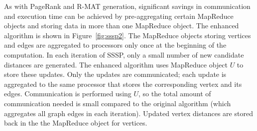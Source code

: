 As with PageRank and R-MAT generation, 
significant savings in communication and execution time
can be achieved by pre-aggregating certain MapReduce objects and 
storing data in more than one MapReduce object.  The enhanced algorithm
is shown in Figure~\ref{fig:sssp2}.  The MapReduce objects storing
vertices and edges are aggregated to processors only once at the beginning
of the computation.  In each iteration of 
SSSP, only a small number of new candidate distances are generated.
The enhanced algorithm uses MapReduce object $U$ to store these updates.
Only the updates are communicated; each update is aggregated to the 
same processor that stores the corresponding vertex and its edges.
Communication is performed using $U$, so the total amount of communication
needed is small compared to the original algorithm (which aggregates all
graph edges in each iteration).  Updated vertex distances are stored back
in the the MapReduce object for vertices.

